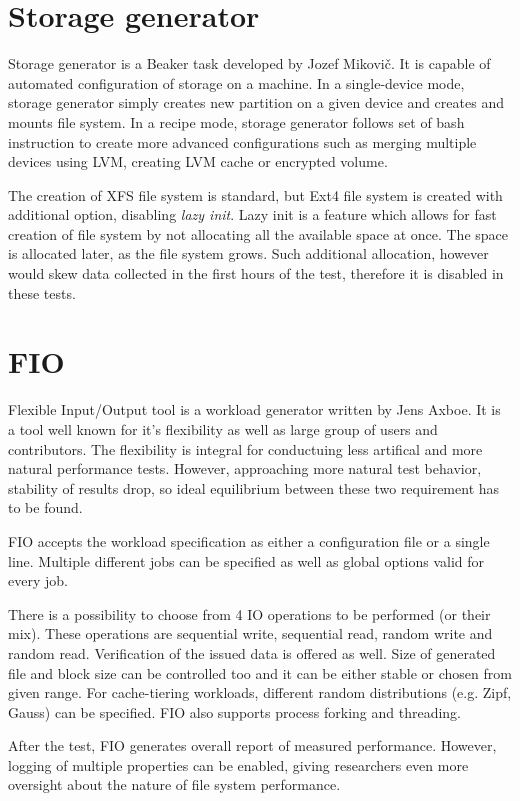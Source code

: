 \documentclass[
  color, %
  table, %
  lof,   %
  lot,   %
]{fithesis3}
\begin{document}
\section{Storage generator}
Storage generator is a Beaker task developed by Jozef Mikovič. It is capable of automated configuration of storage on a machine. In a single-device mode, storage generator simply creates new partition on a given device and creates and mounts file system. In a recipe mode, storage generator follows set of bash instruction to create more advanced configurations such as merging multiple devices using LVM, creating LVM cache or encrypted volume.

The creation of XFS file system is standard, but Ext4 file system is created with additional option, disabling \emph{lazy init}. Lazy init is a feature which allows for fast creation of file system by not allocating all the available space at once. The space is allocated later, as the file system grows. Such additional allocation, however would skew data collected in the first hours of the test, therefore it is disabled in these tests.

\section{FIO}
Flexible Input/Output tool is a workload generator written by Jens Axboe. It is a tool well known for it's flexibility as well as large group of users and contributors. The flexibility is integral for conductuing less artifical and more natural performance tests. However, approaching more natural test behavior, stability of results drop, so ideal equilibrium between these two requirement has to be found.

FIO accepts the workload specification as either a configuration file or a single line. Multiple different jobs can be specified as well as global options valid for every job. 

There is a possibility to choose from 4 IO operations to be performed (or their mix). These operations are sequential write, sequential read, random write and random read. Verification of the issued data is offered as well. Size of generated file and block size can be controlled too and it can be either stable or chosen from given range. For cache-tiering workloads, different random distributions (e.g. Zipf, Gauss) can be specified. FIO also supports process forking and threading.

After the test, FIO generates overall report of measured performance. However, logging of multiple properties can be enabled, giving researchers even more oversight about the nature of file system performance.
\end{document}
